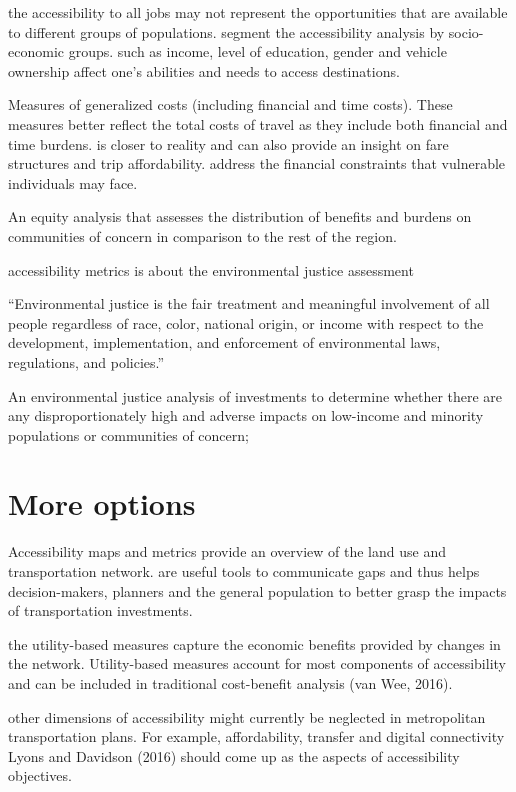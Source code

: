 \documentclass[12pt,]{article}
\begin{document}
the accessibility to all jobs may not represent the opportunities that
are available to different groups of populations. segment the
accessibility analysis by socio-economic groups. such as income, level
of education, gender and vehicle ownership affect one's abilities and
needs to access destinations.

Measures of generalized costs (including financial and time costs).
These measures better reflect the total costs of travel as they include
both financial and time burdens. is closer to reality and can also
provide an insight on fare structures and trip affordability. address
the financial constraints that vulnerable individuals may face.

An equity analysis that assesses the distribution of benefits and
burdens on communities of concern in comparison to the rest of the
region.

accessibility metrics is about the environmental justice assessment

``Environmental justice is the fair treatment and meaningful involvement
of all people regardless of race, color, national origin, or income with
respect to the development, implementation, and enforcement of
environmental laws, regulations, and policies.''

An environmental justice analysis of investments to determine whether
there are any disproportionately high and adverse impacts on low-income
and minority populations or communities of concern;

\hypertarget{more-options}{%
\section{More options}\label{more-options}}

Accessibility maps and metrics provide an overview of the land use and
transportation network. are useful tools to communicate gaps and thus
helps decision-makers, planners and the general population to better
grasp the impacts of transportation investments.

the utility-based measures capture the economic benefits provided by
changes in the network. Utility-based measures account for most
components of accessibility and can be included in traditional
cost-benefit analysis (van Wee, 2016).

other dimensions of accessibility might currently be neglected in
metropolitan transportation plans. For example, affordability, transfer
and digital connectivity Lyons and Davidson (2016) should come up as the
aspects of accessibility objectives.
\end{document}
